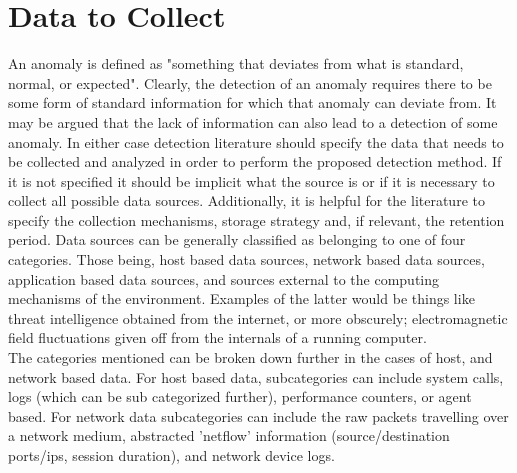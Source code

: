 \documentclass[10pt]{IEEEtran}
\begin{document}
\section{Data to Collect}
An anomaly is defined as "something that deviates from what is standard, normal, or expected". Clearly, the detection of an anomaly requires there to be some form of standard information for which that anomaly can deviate from. It may be argued that the lack of information can also lead to a detection of some anomaly. In either case detection literature should specify the data that needs to be collected and analyzed in order to perform the proposed detection method. If it is not specified it should be implicit what the source is or if it is necessary to collect all possible data sources. Additionally, it is helpful for the literature to specify the collection mechanisms, storage strategy and, if relevant, the retention period. Data sources can be generally classified as belonging to one of four categories. Those being, host based data sources, network based data sources, application based data sources, and sources external to the computing mechanisms of the environment. Examples of the latter would be things like threat intelligence obtained from the internet, or more obscurely; electromagnetic field fluctuations given off from the internals of a running computer. \\
The categories mentioned can be broken down further in the cases of host, and network based data. For host based data, subcategories can include system calls, logs (which can be sub categorized further), performance counters, or agent based. For network data subcategories can include the raw packets travelling over a network medium, abstracted 'netflow' information (source/destination ports/ips, session duration), and network device logs. \\
\end{document}
